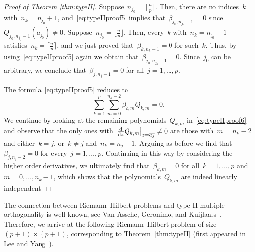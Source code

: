 \documentclass[pdftex]{sigma}
\numberwithin{equation}{section}
\begin{document}
\begin{proof}[Proof of Theorem \ref{thm:typeII}]
 Suppose~$n_{j_0} = \big\lceil \frac{n}{p} \big\rceil$. Then, there are no indices~$k$ with~$n_k = n_{j_0}+1$, and~\eqref{eq:typeIIproof5} implies that~$\beta_{{j_0},n_{j_0}-1} = 0$ since~$Q_{j_0,n_{j_0}-1}(\overline{a_{j_0}}) \neq 0$. Suppose~$n_{j_0} = \big\lfloor \frac{n}{p} \big\rfloor$. Then, every~$k$ with~$n_k = n_{j_0}+1$ satisfies~$n_k = \big\lceil \frac{n}{p} \big\rceil$, and we just proved that~$\beta_{k,n_k-1} = 0$ for such~$k$. Thus, by using~\eqref{eq:typeIIproof5} again we obtain that~$\beta_{{j_0},n_{j_0}-1} = 0$. Since~$j_0$ can be arbitrary, we conclude that~$\beta_{{j},n_{j}-1} = 0$ for all~$j=1, \dots, p$.

 The formula~\eqref{eq:typeIIproof5} reduces to
 \begin{equation}
 \label{eq:typeIIproof6}
 \sum_{k=1}^p \sum_{m=0}^{n_k-2} \beta_{k,m} Q_{k,m} = 0.
 \end{equation}
 We continue by looking at the remaining polynomials~$Q_{k,m}$ in~\eqref{eq:typeIIproof6} and observe that the only ones with~$\frac{\rm d}{{\rm d}z}Q_{k,m}\big|_{z=\overline{a_j}} \neq 0$ are those with~$m = n_k-2$ and either~$k=j$, or~$k\neq j$ and~$n_k=n_j+1$. Arguing as before we find that~$\beta_{j,n_j-2} = 0$ for every~$j=1, \dots, p$. Continuing in this way by considering the higher order derivatives, we ultimately find that~$\beta_{k,m} = 0$ for all~$k=1, \dots, p$ and $m=0, \dots, n_k-1$, which shows that the polynomials~$Q_{k,m}$ are indeed linearly independent.
 \end{proof}


 The connection between Riemann--Hilbert problems and type II multiple orthogonality is well known, see Van Assche, Geronimo, and Kuijlaars~\cite{VAGK}. Therefore, we arrive at the following Riemann--Hilbert problem of size~$(p+1) \times (p+1)$, corresponding to Theorem~\ref{thm:typeII} (first appeared in Lee and Yang~\cite{LY2}).
\end{document}
